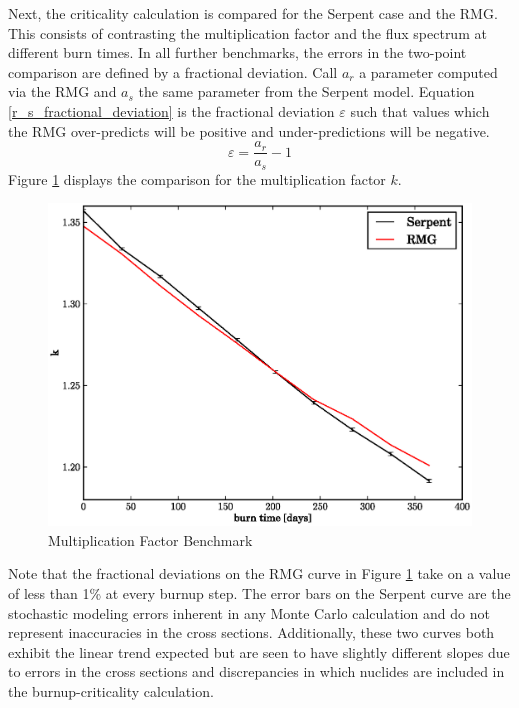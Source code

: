 Next, the criticality calculation is compared for the Serpent case and the RMG.  This consists of 
contrasting the multiplication factor and the flux spectrum at different burn times.  In all further
benchmarks, the errors in the two-point comparison are defined by a fractional deviation.  Call $a_r$ 
a parameter computed via the RMG and $a_s$ the same parameter from the Serpent model.  Equation 
\ref{r_s_fractional_deviation} is the fractional deviation $\varepsilon$ such that values which the RMG
over-predicts will be positive and under-predictions will be negative.
\begin{equation}
\label{r_s_fractional_deviation}
\varepsilon = \frac{a_r}{a_s} - 1
\end{equation}
Figure \ref{k_compare} displays the comparison for the multiplication factor $k$.  
\begin{figure}[htbp]
\caption{Multiplication Factor Benchmark}
\label{k_compare}
\begin{center}
\includegraphics[scale=0.5]{multigroup_method/figs/benchmark/k.eps}
\end{center}
\end{figure}
Note that the fractional deviations on the RMG curve in Figure \ref{k_compare} 
take on a value of less than 1\% at every burnup step.  
The error bars on the Serpent curve are the stochastic modeling errors inherent in any Monte
Carlo calculation and do not represent inaccuracies in the cross sections.
Additionally, these two curves both exhibit the linear trend expected but are seen to have slightly 
different slopes due to errors in the cross sections and discrepancies in which nuclides are included in 
the burnup-criticality calculation.

